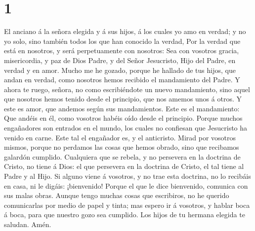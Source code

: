 \hypertarget{section}{%
\section{1}\label{section}}

 El anciano á la señora elegida y á sus hijos, á los cuales
yo amo en verdad; y no yo solo, sino también todos los que han conocido
la verdad,  Por la verdad que está en nosotros, y será
perpetuamente con nosotros:  Sea con vosotros gracia,
misericordia, y paz de Dios Padre, y del Señor Jesucristo, Hijo del
Padre, en verdad y en amor.  Mucho me he gozado, porque he
hallado de tus hijos, que andan en verdad, como nosotros hemos recibido
el mandamiento del Padre.  Y ahora te ruego, señora, no como
escribiéndote un nuevo mandamiento, sino aquel que nosotros hemos tenido
desde el principio, que nos amemos unos á otros.  Y este es
amor, que andemos según sus mandamientos. Este es el mandamiento: Que
andéis en él, como vosotros habéis oído desde el principio. 
Porque muchos engañadores son entrados en el mundo, los cuales no
confiesan que Jesucristo ha venido en carne. Este tal el engañador es, y
el anticristo.  Mirad por vosotros mismos, porque no
perdamos las cosas que hemos obrado, sino que recibamos galardón
cumplido.  Cualquiera que se rebela, y no persevera en la
doctrina de Cristo, no tiene á Dios: el que persevera en la doctrina de
Cristo, el tal tiene al Padre y al Hijo.  Si alguno viene á
vosotros, y no trae esta doctrina, no lo recibáis en casa, ni le digáis:
¡bienvenido!  Porque el que le dice bienvenido, comunica
con sus malas obras.  Aunque tengo muchas cosas que
escribiros, no he querido comunicarlas por medio de papel y tinta; mas
espero ir á vosotros, y hablar boca á boca, para que nuestro gozo sea
cumplido.  Los hijos de tu hermana elegida te saludan.
Amén.
